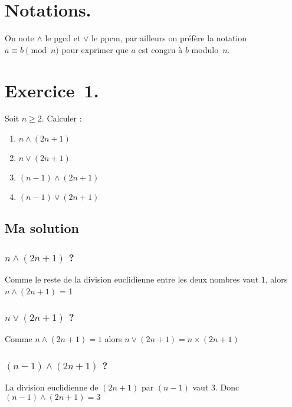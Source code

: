 \documentclass[a4paper,14pt]{extarticle} %
\begin{document}
 



\setlength{\parindent}{0pt}



\section*{Notations.}

On note $\wedge$ le pgcd et $\vee$ le ppcm, par ailleurs on préfère la notation $a\equiv b \pmod{n}$ pour exprimer que $a$ est congru à $b$ modulo~$n$.

\section*{Exercice~1.}

Soit $n\geqslant 2$. Calculer :
\begin{enumerate}
\item $n \wedge (2n+1)$
\item $n \vee (2n+1)$
\item $(n-1)\wedge(2n+1)$
\item $(n-1)\vee(2n+1)$
\end{enumerate}

\subsection*{Ma solution}

\subsubsection*{$n \wedge (2n+1)$ ?}

Comme le reste de la division euclidienne entre les deux nombres vaut $1$, alors  $n \wedge (2n+1)$ = 1



\subsubsection*{$n \vee (2n+1)$ ?}

Comme $n \wedge (2n+1) = 1$ alors $n \vee (2n+1) = n \times (2n+1)$



\subsubsection*{$(n-1)\wedge(2n+1)$ ?}

La division euclidienne de $(2n+1)$ par $(n-1)$ vaut 3. Donc $(n-1)\wedge(2n+1) = 3$
\end{document}
